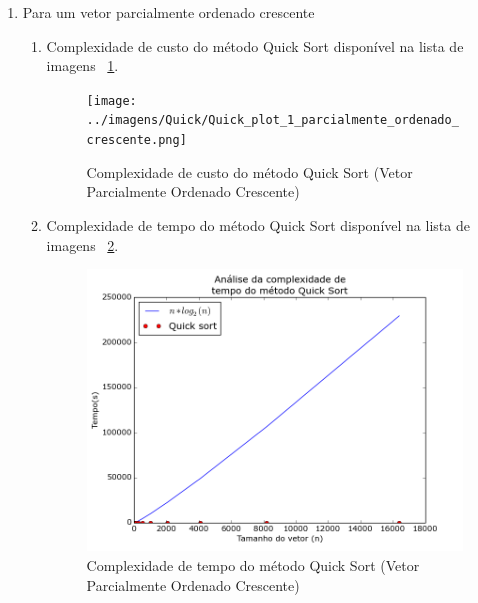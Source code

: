 \documentclass[12pt,a4paper,twoside]{report}
\begin{document}
\begin{enumerate}
\begin{enumerate}
				\end{enumerate}


			\item Para um vetor parcialmente ordenado crescente
							\begin{enumerate}
								\item Complexidade de custo do método Quick Sort disponível na lista de imagens ~\ref{fig:QuickPlot1POC}.
								\begin{figure}[!h]
									\centering
									\texttt{[image: ../imagens/Quick/Quick\_plot\_1\_parcialmente\_ordenado\_crescente.png]}
									\caption{Complexidade de custo do método Quick Sort (Vetor Parcialmente Ordenado Crescente) \label{fig:QuickPlot1POC}}
								\end{figure}


								\item Complexidade de tempo do método Quick Sort disponível na lista de imagens ~\ref{fig:QuickPlot2POC}.
								\begin{figure}[!h]
									\centering
									\includegraphics[scale=0.6]{../imagens/Quick/Quick_plot_2_parcialmente_ordenado_crescente.png}
									\caption{Complexidade de tempo do método Quick Sort (Vetor Parcialmente Ordenado Crescente) \label{fig:QuickPlot2POC}}
								\end{figure}



\end{enumerate}
\end{enumerate}
\end{document}
